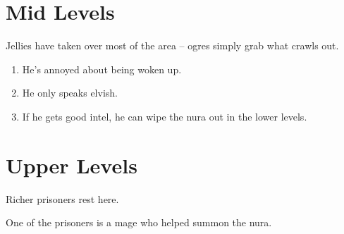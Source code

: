 \section{Mid Levels}

\begin{multicols}{2}


Jellies have taken over most of the area -- ogres simply grab what crawls out.

\jelly

\jelly


\dragon

\begin{enumerate}

	\item{He's annoyed about being woken up.}
	\item{He only speaks elvish.}
	\item{If he gets good intel, he can wipe the nura out in the lower levels.}

\end{enumerate}


\end{multicols}

\section{Upper Levels}

\begin{multicols}{2}


Richer prisoners rest here.

One of the prisoners is a mage who helped summon the nura.

\humandiplomat


\umberhulk

\end{multicols}

